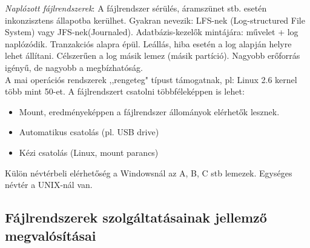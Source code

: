 \documentclass[margin=0px]{article}
\begin{document}
	\textit{Naplózott fájlrendszerek}: A fájlrendszer sérülés, áramszünet stb. esetén inkonzisztens állapotba kerülhet. Gyakran nevezik: LFS-nek (Log-structured File System) vagy JFS-nek(Journaled). Adatbázis-kezelők mintájára: művelet + log naplózódik. Tranzakciós alapra épül. Leállás, hiba esetén a log alapján helyre lehet állítani. Célszerűen a log másik lemez (másik partíció). Nagyobb erőforrás igényű, de nagyobb a megbízhatóság. \\
	A mai operációs rendszerek ,,rengeteg" típust támogatnak, pl: Linux 2.6 kernel több mint 50-et.
	A fájlrendszert csatolni többféleképpen is lehet:
	\begin{itemize}
		\item Mount, eredményeképpen a fájlrendszer állományok elérhetők lesznek.
		\item Automatikus csatolás (pl. USB drive)
		\item Kézi csatolás (Linux, mount parancs)
	\end{itemize}
	Külön névtérbeli elérhetőség a Windowsnál az A, B, C stb lemezek. Egységes névtér a UNIX-nál van.
	
	\subsection{Fájlrendszerek szolgáltatásainak jellemző megvalósításai}
	
\end{document}
